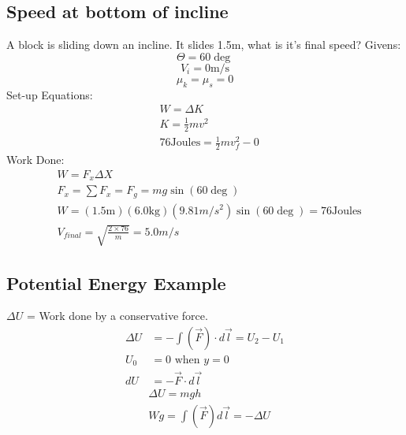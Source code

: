 \documentclass[8pt, twocolumn]{article}
\begin{document}
\subsection{Speed at bottom of incline}
	A block is sliding down an incline.  It slides 1.5m, what is it's final speed?
	\newline
	Givens:
	\[\Theta = 60 \deg\]
	\[V_i = 0 \text{m/s}\]
	\[\mu_k = \mu_s = 0\]
	\newline
	Set-up Equations:
	\[\begin{aligned}
	&W = \Delta K \\
	&K = \frac{1}{2}mv^2 \\
	&76 \text{Joules} = \frac{1}{2}mv_f^2 - 0\end{aligned}\]
	\newline
	Work Done:
	\[\begin{aligned}
	&W = F_x \Delta X \\
	&F_x = \sum F_x = F_g = mg\sin(60 \deg) \\
	&W = (1.5\text{m})(6.0\text{kg})(9.81 m/s^2) \sin(60 \deg) = 76 \text{Joules} \\
	&V_{final} = \sqrt{\frac{2 \times 76}{m}} = 5.0m/s
	\end{aligned}\]

\subsection{Potential Energy Example}
	$\Delta U$ = Work done by a conservative force. \newline
	\[\begin{aligned}
		\Delta U &= - \int (\vec{F}) \cdot d \vec{l} = U_2 - U_1 \\
		U_0 &= 0 \text{ when } y = 0 \\
		dU &= - \vec{F} \cdot d \vec{l}
	\end{aligned}\]
	\[\begin{aligned}
		&\Delta U = mgh \\
		&Wg = \int(\vec{F})d\vec{l} = -\Delta U
	\end{aligned}\]
\end{document}
